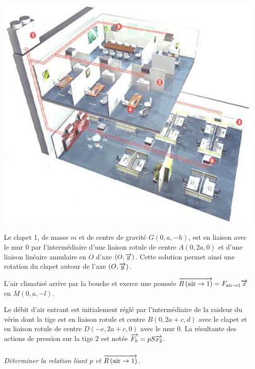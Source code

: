 \documentclass[10pt,fleqn]{article} %
\begin{document}
\begin{multicols}{2}
\begin{center}
\includegraphics[width=.95\linewidth]{images/img1}
\end{center}




Le clapet 1, de masse $m$ et de centre de gravité $G (0,a,-h)$, est en liaison avec le mur 0 par l’intermédiaire d’une liaison rotule de centre $A (0,2a,0)$ et d’une liaison linéaire annulaire en $O$ d’axe $(O, \overrightarrow{y})$. Cette solution permet ainsi une rotation du clapet autour de l’axe $(O, \overrightarrow{y})$.

L’air climatisé arrive par la bouche et exerce une poussée $\overrightarrow{R\left( {\text{air}} \rightarrow {1}\right)} = F_{\text{air}\rightarrow 1}\overrightarrow{x}$ en $M (0,a,-l)$.  

Le débit d’air entrant est initialement réglé par l’intermédiaire de la raideur du vérin dont la tige est en liaison rotule et centre $B (0,2a+c,d)$  avec le clapet et en liaison rotule de centre $D (-e,2a+c,0)$  avec le mur 0. %
La résultante des actions de pression sur la tige 2 est notée $\overrightarrow{F_h}=pS \overrightarrow{x_2}$.
%
% 
%
% 
  \subparagraph{}
 \textit{Déterminer la relation liant $p$ et 
 $\overrightarrow{R\left( {\text{air}} \rightarrow {1}\right)}$.}
 

\end{multicols}
\end{document}
